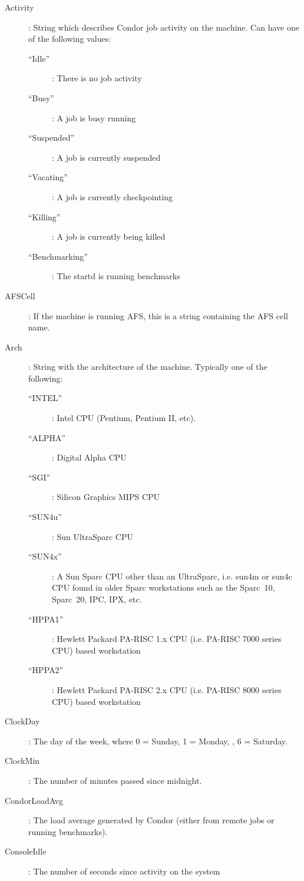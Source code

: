 \begin{description}
%
\item[Activity] : String which describes Condor job activity on the machine.
Can have one of the following values:
	\begin{description}
	\item[``Idle''] : There is no job activity
	\item[``Busy''] : A job is busy running
	\item[``Suspended''] : A job is currently suspended
	\item[``Vacating''] : A job is currently checkpointing
	\item[``Killing''] : A job is currently being killed
	\item[``Benchmarking''] : The startd is running benchmarks
	\end{description}
%
\item[AFSCell] : If the machine is running AFS, this is a string
containing the AFS cell name.
%
\item[Arch] : String with the architecture of the machine.  Typically
one of the following: 
	\begin{description}
	\item[``INTEL''] : Intel CPU (Pentium, Pentium II, etc).
	\item[``ALPHA''] : Digital Alpha CPU
	\item[``SGI''] : Silicon Graphics MIPS CPU
	\item[``SUN4u''] : Sun UltraSparc CPU
	\item[``SUN4x''] : A Sun Sparc CPU other than an UltraSparc, i.e.
sun4m or sun4c CPU found in older Sparc workstations such as the Sparc~10, 
Sparc~20, IPC, IPX, etc.
	\item[``HPPA1''] :  Hewlett Packard PA-RISC 1.x CPU (i.e. PA-RISC    
                      7000 series CPU) based workstation
	\item[``HPPA2''] :  Hewlett Packard PA-RISC 2.x CPU (i.e. PA-RISC    
                      8000 series CPU) based workstation
	\end{description}
%
\item[ClockDay] : The day of the week, where 0 = Sunday, 1 = Monday, \Dots, 6 = Saturday. 
%
\item[ClockMin] : The number of minutes passed since midnight.
%
\item[CondorLoadAvg] : The load average generated by Condor (either
from remote jobs or running benchmarks).
%
\item[ConsoleIdle] : The number of seconds since activity on the system

\end{description}
